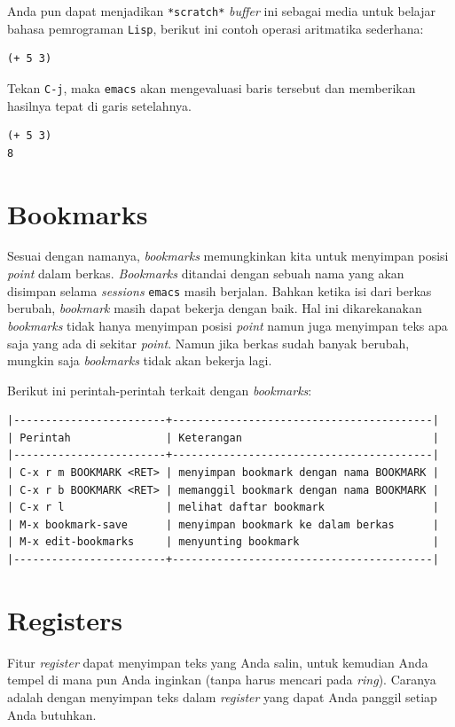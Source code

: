 \documentclass{article}
\begin{document}
Anda pun dapat menjadikan \verb=*scratch*= \emph{buffer} ini sebagai media
untuk belajar bahasa pemrograman \verb=Lisp=, berikut ini contoh operasi
aritmatika sederhana:

\begin{verbatim}
(+ 5 3)
\end{verbatim}

Tekan \verb=C-j=, maka \verb=emacs= akan mengevaluasi baris tersebut dan 
memberikan hasilnya tepat di garis setelahnya.

\begin{verbatim}
(+ 5 3)
8
\end{verbatim}

\section{Bookmarks}
Sesuai dengan namanya, \emph{bookmarks} memungkinkan kita untuk menyimpan
posisi \emph{point} dalam berkas. \emph{Bookmarks} ditandai dengan sebuah nama
yang akan disimpan selama \emph{sessions} \verb=emacs= masih berjalan. Bahkan
ketika isi dari berkas berubah, \emph{bookmark} masih dapat bekerja dengan baik.
Hal ini dikarekanakan \emph{bookmarks} tidak hanya menyimpan posisi \emph{point}
namun juga menyimpan teks apa saja yang ada di sekitar \emph{point}. Namun jika
berkas sudah banyak berubah, mungkin saja \emph{bookmarks} tidak akan bekerja
lagi.

Berikut ini perintah-perintah terkait dengan \emph{bookmarks}:

\begin{verbatim}
|------------------------+-----------------------------------------|
| Perintah               | Keterangan                              |
|------------------------+-----------------------------------------|
| C-x r m BOOKMARK <RET> | menyimpan bookmark dengan nama BOOKMARK |
| C-x r b BOOKMARK <RET> | memanggil bookmark dengan nama BOOKMARK |
| C-x r l                | melihat daftar bookmark                 |
| M-x bookmark-save      | menyimpan bookmark ke dalam berkas      |
| M-x edit-bookmarks     | menyunting bookmark                     |
|------------------------+-----------------------------------------|
\end{verbatim}

\section{Registers}
Fitur \emph{register} dapat menyimpan teks yang Anda salin, untuk kemudian 
Anda tempel di mana pun Anda inginkan (tanpa harus mencari pada \emph{ring}).
Caranya adalah dengan menyimpan teks dalam \emph{register} yang dapat Anda
panggil setiap Anda butuhkan. 
\end{document}
